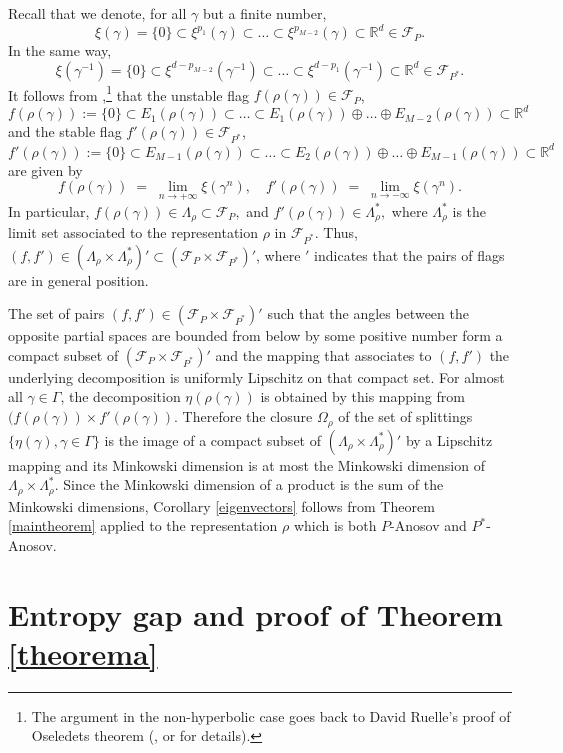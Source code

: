 \documentclass[10pt]{amsart}
\newcommand{\R}{\mathbb{R}}
\newcommand{\F}{\mathcal{F}}
\let\G\Gamma
\let\g\gamma
\let\La\Lambda
\let\Om\Omega
\let\x\times
\begin{document}
Recall that we denote, for all \(\g\) but a finite number,
\[
\xi(\gamma) = \{0\} \subset \xi^{p_1}(\gamma) \subset \ldots \subset \xi^{p_{M-2}}(\gamma)\subset \R^d \in \F_P.
\]
In the same way,
\[
\xi(\gamma^{-1}) = \{0\} \subset \xi^{d-p_{M-2}}(\gamma^{-1}) \subset \ldots \subset \xi^{d-p_1}(\gamma^{-1})\subset \R^d \in \F_{P^\ast}.
\]
It follows from \cite[Lem.\,2.26]{GGKW17},\footnote{The argument in the non-hyperbolic case goes back to David Ruelle's proof of Oseledets theorem (\cite{Rue79}, \cf \cite[Prop.\,3.2]{Led84} or \cite[p.\,141--142]{Sim15} for details).}
that the unstable flag \(f(\rho (\g)) \in \F_P\),
\[
 f(\rho (\g)) := \{ 0\} \subset E_1(\rho (\g)) \subset \ldots \subset E_1 (\rho (\g)) \oplus \ldots \oplus E_{M-2}(\rho (\g)) \subset \R^d 
\]
and the stable flag \(f'(\rho (\g)) \in \F_{P^\ast}\),
\[
 f'(\rho (\g)) := \{ 0\} \subset E_{M-1}(\rho (\g)) \subset \ldots \subset E_2 (\rho (\g)) \oplus \ldots \oplus E_{M-1}(\rho (\g)) \subset \R^d 
\]
are given by
\[
 f(\rho (\g)) \; =\; \lim_{n\to +\infty} \xi (\g^n), \quad f'(\rho (\g)) \; =\; \lim_{n \to - \infty} \xi (\g^n).
\]
In particular, \(f (\rho (\g)) \in \La_\rho \subset \F_P, \) and \(f'(\rho (\g)) \in \La_\rho^\ast, \) where \(\La_\rho^\ast \) is the limit set associated to the representation \(\rho\) in \(\F_{P^\ast}\). Thus, \((f,f')\in
(\La_\rho \x \La_\rho^\ast)' \subset (\F_{P} \x \F_{P^\ast})'\), where \('\) indicates that the pairs of flags are in general position.

The set of pairs \((f,f') \in (\F_P \x \F_{P^\ast})'\) such that the angles between the opposite partial spaces are bounded from below by some positive number form a compact subset of
\((\F_P \x \F_{P^\ast})'\) and the mapping that associates to \((f,f')\) the underlying decomposition is uniformly Lipschitz on that compact set. For almost all \(\g \in \G\), the decomposition \(\eta (\rho (\g))\) is obtained by this mapping from \((f(\rho (\g)) \x f'(\rho (\g))\). Therefore the closure \(\Om_\rho \) of the set of splittings \(\{ \eta (\g), \g\in \G\} \) is the image of a compact subset of \((\La_\rho \x \La_\rho^\ast)' \) by a Lipschitz mapping and its Minkowski dimension is at most the Minkowski dimension of \(\La_\rho \x \La_\rho^\ast \). Since the Minkowski dimension of a product is the sum of the Minkowski dimensions, Corollary \ref{eigenvectors} follows from Theorem \ref{maintheorem} applied to the representation \(\rho\) which is both \(P \)-Anosov and \(P^\ast\)-Anosov.

\section{Entropy gap and proof of Theorem \ref{theorema}}\label{prooftheorema}
\end{document}
